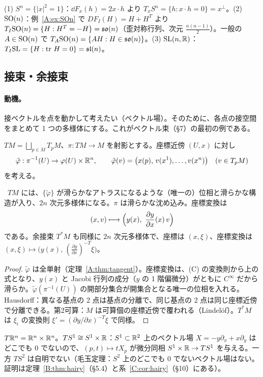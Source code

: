 \begin{ex}
(1) $S^n=\{|x|^2=1\}$：$\dd F_x(h)=2x\cdot h$ より $T_xS^n=\{h:x\cdot h=0\}=x^\perp$。(2) $\mathrm{SO}(n)$：例~\ref{A:ex:SOn} で $DF_I(H)=H+H^T$ より $T_I\mathrm{SO}(n)=\{H:H^T=-H\}=\mathfrak{so}(n)$（歪対称行列、次元 $\frac{n(n-1)}2$）。一般の $A\in\mathrm{SO}(n)$ で $T_A\mathrm{SO}(n)=\{AH:H\in\mathfrak{so}(n)\}$。(3) $\mathrm{SL}(n,\mathbb R)$：$T_I\mathrm{SL}=\{H:\operatorname{tr}\,H=0\}=\mathfrak{sl}(n)$。
\end{ex}

\subsection{接束・余接束}
\paragraph{動機。}接ベクトルを点を動かして考えたい（ベクトル場）。そのために、各点の接空間をまとめて 1 つの多様体にする。これがベクトル束（§7）の最初の例である。

$TM=\bigsqcup_{p\in M}T_pM$、$\pi:TM\to M$ を射影とする。座標近傍 $(U,x)$ に対し
\[
\tilde\varphi:\pi^{-1}(U)\to\varphi(U)\times\mathbb R^n,\qquad\tilde\varphi(v)=\bigl(x(p),\,v(x^1),\dots,v(x^n)\bigr)\quad(v\in T_pM)
\]
を考える。

\begin{thm}[接束]\label{A:thm:TM}
\tP\ $TM$ には、$\{\tilde\varphi\}$ が滑らかなアトラスになるような（唯一の）位相と滑らかな構造が入り、$2n$ 次元多様体になる。$\pi$ は滑らかな沈め込み。座標変換は
\[
(x,v)\longmapsto\Bigl(y(x),\ \frac{\partial y}{\partial x}(x)\,v\Bigr)
\]
である。余接束 $T^*M$ も同様に $2n$ 次元多様体で、座標は $(x,\xi)$、座標変換は $(x,\xi)\mapsto\bigl(y(x),\,(\tfrac{\partial y}{\partial x})^{-T}\xi\bigr)$。
\end{thm}
\begin{proof}
$\tilde\varphi$ は全単射（定理~\ref{A:thm:tangent}）。座標変換は、(C) の変換則から上の式となり、$y(x)$ と Jacobi 行列の成分（$y$ の 1 階偏微分）がともに $C^\infty$ だから滑らか。$\tilde\varphi(\pi^{-1}(U))$ の開部分集合が開集合となる唯一の位相を入れる。Hausdorff：異なる基点の 2 点は基点の分離で、同じ基点の 2 点は同じ座標近傍で分離できる。第2可算：$M$ は可算個の座標近傍で覆われる（Lindelöf）。$T^*M$ は $\xi_i$ の変換則 $\xi'=(\partial y/\partial x)^{-T}\xi$ で同様。
\end{proof}

\begin{ex}
$T\mathbb R^n=\mathbb R^n\times\mathbb R^n$。$TS^1\cong S^1\times\mathbb R$：$S^1\subset\mathbb R^2$ 上のベクトル場 $X=-y\partial_x+x\partial_y$ はどこでも $0$ でないので、$(p,t)\mapsto tX_p$ が微分同相 $S^1\times\mathbb R\to TS^1$ を与える。一方 $TS^2$ は自明でない（毛玉定理：$S^2$ 上のどこでも $0$ でないベクトル場はない。証明は定理~\ref{B:thm:hairy}（§5.4）と系~\ref{C:cor:hairy}（§10）にある）。
\end{ex}

